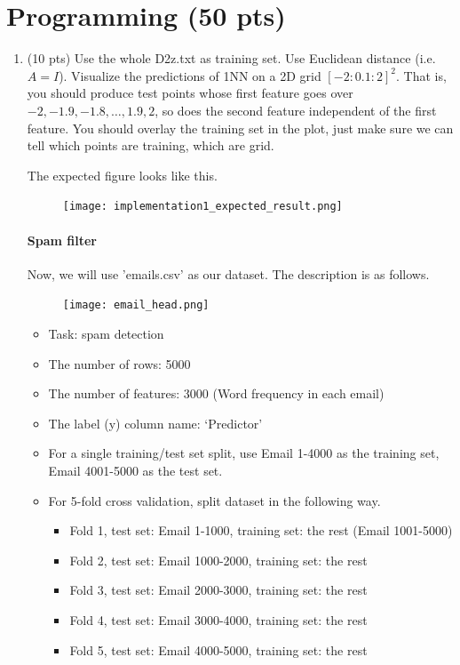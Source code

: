 \documentclass[a4paper]{article}
\theoremstyle{definition}
\begin{document}
\section{Programming (50 pts)}
\begin{enumerate}
	\item (10 pts) Use the whole D2z.txt as training set.  Use Euclidean distance (i.e. $A=I$).
	Visualize the predictions of 1NN on a 2D grid $[-2:0.1:2]^2$.
	That is, you should produce test points whose first feature goes over $-2, -1.9, -1.8, \ldots, 1.9, 2$, so does the second feature independent of the first feature.
	You should overlay the training set in the plot, just make sure we can tell which points are training, which are grid.
	
	The expected figure looks like this.
	\begin{figure}[h]
		\centering
		\texttt{[image: implementation1\_expected\_result.png]}
	\end{figure}
	
	\paragraph{Spam filter} Now, we will use 'emails.csv' as our dataset. The description is as follows.
	\begin{figure}[h]
		\centering
		\texttt{[image: email\_head.png]}
	\end{figure}
	
	\begin{itemize}
		\item Task: spam detection
		\item The number of rows: 5000
		\item The number of features: 3000 (Word frequency in each email)
		\item The label (y) column name: `Predictor'
		\item For a single training/test set split, use Email 1-4000 as the training set, Email 4001-5000 as the test set.
		\item For 5-fold cross validation, split dataset in the following way.
		\begin{itemize}
			\item Fold 1, test set: Email 1-1000, training set: the rest (Email 1001-5000)
			\item Fold 2, test set: Email 1000-2000, training set: the rest
			\item Fold 3, test set: Email 2000-3000, training set: the rest
			\item Fold 4, test set: Email 3000-4000, training set: the rest
			\item Fold 5, test set: Email 4000-5000, training set: the rest			
		\end{itemize}
	\end{itemize}
	

\end{enumerate}
\end{document}
